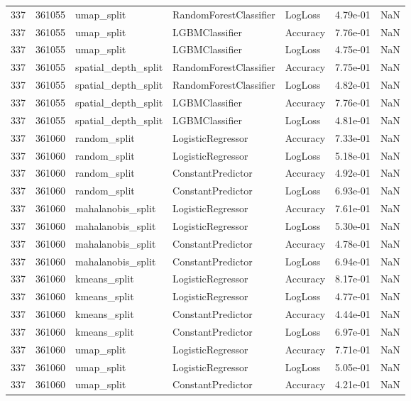 \begin{tabular}{rrlllrr}
337 & 361055 & umap\_split & RandomForestClassifier & LogLoss & 4.79e-01 & NaN \\
337 & 361055 & umap\_split & LGBMClassifier & Accuracy & 7.76e-01 & NaN \\
337 & 361055 & umap\_split & LGBMClassifier & LogLoss & 4.75e-01 & NaN \\
337 & 361055 & spatial\_depth\_split & RandomForestClassifier & Accuracy & 7.75e-01 & NaN \\
337 & 361055 & spatial\_depth\_split & RandomForestClassifier & LogLoss & 4.82e-01 & NaN \\
337 & 361055 & spatial\_depth\_split & LGBMClassifier & Accuracy & 7.76e-01 & NaN \\
337 & 361055 & spatial\_depth\_split & LGBMClassifier & LogLoss & 4.81e-01 & NaN \\
337 & 361060 & random\_split & LogisticRegressor & Accuracy & 7.33e-01 & NaN \\
337 & 361060 & random\_split & LogisticRegressor & LogLoss & 5.18e-01 & NaN \\
337 & 361060 & random\_split & ConstantPredictor & Accuracy & 4.92e-01 & NaN \\
337 & 361060 & random\_split & ConstantPredictor & LogLoss & 6.93e-01 & NaN \\
337 & 361060 & mahalanobis\_split & LogisticRegressor & Accuracy & 7.61e-01 & NaN \\
337 & 361060 & mahalanobis\_split & LogisticRegressor & LogLoss & 5.30e-01 & NaN \\
337 & 361060 & mahalanobis\_split & ConstantPredictor & Accuracy & 4.78e-01 & NaN \\
337 & 361060 & mahalanobis\_split & ConstantPredictor & LogLoss & 6.94e-01 & NaN \\
337 & 361060 & kmeans\_split & LogisticRegressor & Accuracy & 8.17e-01 & NaN \\
337 & 361060 & kmeans\_split & LogisticRegressor & LogLoss & 4.77e-01 & NaN \\
337 & 361060 & kmeans\_split & ConstantPredictor & Accuracy & 4.44e-01 & NaN \\
337 & 361060 & kmeans\_split & ConstantPredictor & LogLoss & 6.97e-01 & NaN \\
337 & 361060 & umap\_split & LogisticRegressor & Accuracy & 7.71e-01 & NaN \\
337 & 361060 & umap\_split & LogisticRegressor & LogLoss & 5.05e-01 & NaN \\
337 & 361060 & umap\_split & ConstantPredictor & Accuracy & 4.21e-01 & NaN \\

\end{tabular}

